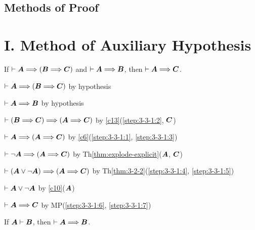 \subsection{Methods of Proof}
\section*{I. Method of Auxiliary Hypothesis}

\begin{lemma}\label{lemma:hypothetical-syllogism}
If $\vdash\boldsymbol{A}\Longrightarrow(\boldsymbol{B}\Longrightarrow\boldsymbol{C})$
and $\vdash\boldsymbol{A}\Longrightarrow\boldsymbol{B}$,
then $\vdash\boldsymbol{A}\Longrightarrow\boldsymbol{C}$.
\end{lemma}

\begin{pf}
\item\label{step:3-3-1:1} $\vdash\boldsymbol{A}\Longrightarrow(\boldsymbol{B}\Longrightarrow\boldsymbol{C})$
  by hypothesis
\item\label{step:3-3-1:2} $\vdash\boldsymbol{A}\Longrightarrow\boldsymbol{B}$
  by hypothesis
\item\label{step:3-3-1:3} $\vdash(\boldsymbol{B}\Longrightarrow\boldsymbol{C})\Longrightarrow(\boldsymbol{A}\Longrightarrow\boldsymbol{C})$
  by \ref{c13}(\ref{step:3-3-1:2}, $\boldsymbol{C}$)
\item\label{step:3-3-1:4} $\vdash\boldsymbol{A}\Longrightarrow(\boldsymbol{A}\Longrightarrow\boldsymbol{C})$
  by \ref{c6}(\ref{step:3-3-1:1}, \ref{step:3-3-1:3})
\item\label{step:3-3-1:5} $\vdash\neg\boldsymbol{A}\Longrightarrow(\boldsymbol{A}\Longrightarrow\boldsymbol{C})$
  by Th\ref{thm:explode-explicit}($\boldsymbol{A}$, $\boldsymbol{C}$)
\item\label{step:3-3-1:6} $\vdash(\boldsymbol{A}\lor\neg\boldsymbol{A})\Longrightarrow(\boldsymbol{A}\Longrightarrow\boldsymbol{C})$
  by Th\ref{thm:3-2-2}(\ref{step:3-3-1:4}, \ref{step:3-3-1:5})
\item\label{step:3-3-1:7} $\vdash\boldsymbol{A}\lor\neg\boldsymbol{A}$
  by \ref{c10}($\boldsymbol{A}$)
\item\label{step:3-3-1:8} $\vdash\boldsymbol{A}\Longrightarrow\boldsymbol{C}$
  by MP(\ref{step:3-3-1:6}, \ref{step:3-3-1:7})
\end{pf}

\begin{dc}\label{c14}
If $\boldsymbol{A}\vdash\boldsymbol{B}$, then $\vdash\boldsymbol{A}\Longrightarrow\boldsymbol{B}$.
\end{dc}

